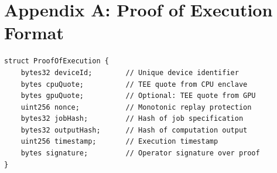 \section{Appendix A: Proof of Execution Format}


\begin{lstlisting}[language=Solidity, basicstyle=\footnotesize\ttfamily]
struct ProofOfExecution {
    bytes32 deviceId;        // Unique device identifier
    bytes cpuQuote;          // TEE quote from CPU enclave
    bytes gpuQuote;          // Optional: TEE quote from GPU
    uint256 nonce;           // Monotonic replay protection
    bytes32 jobHash;         // Hash of job specification
    bytes32 outputHash;      // Hash of computation output
    uint256 timestamp;       // Execution timestamp
    bytes signature;         // Operator signature over proof
}
\end{lstlisting}


